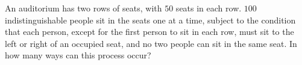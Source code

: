 An auditorium has two rows of seats, with $50$ seats in each row. $100$ indistinguishable people sit in the seats one at a time, subject to the condition that each person, except for the first person to sit in each row, must sit to the left or right of an occupied seat, and no two people can sit in the same seat. In how many ways can this process occur?